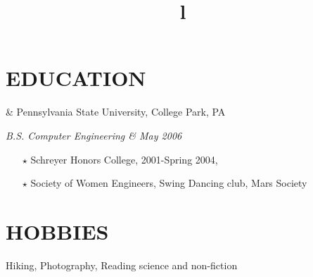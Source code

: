 \documentclass[11pt]{res} %
\begin{document}
\begin{resume}
    \section{EDUCATION}
    \begin{ncolumn}{2}
	    & \hfill {}Pennsylvania State University, College Park, PA \\
	    \title{l} \itshape B.S. Computer Engineering & \hfill {} May 2006 \\
    \end{ncolumn}
    \begin{itemize} \itemsep -2pt
    	\item[$\star$] Schreyer Honors College, 2001-Spring 2004,
	    \item[$\star$] Society of Women Engineers, Swing Dancing club, Mars Society
    \end{itemize}

    \section{HOBBIES}
    Hiking, Photography, Reading science and non-fiction

  \end{resume}
\end{document}
